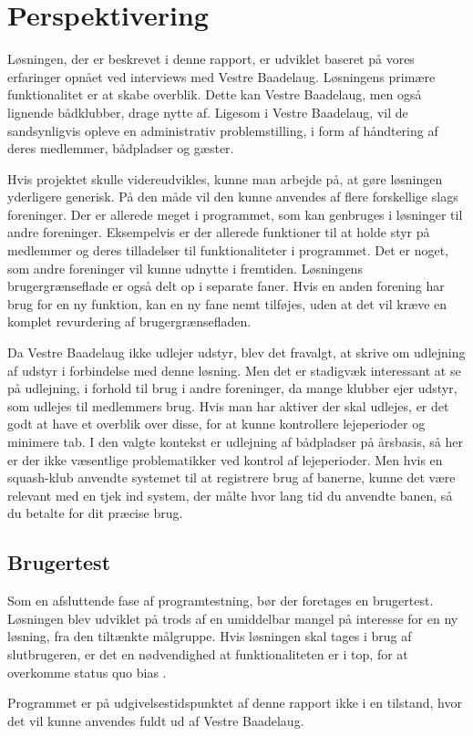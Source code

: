 \chapter{Perspektivering}
\label{cha:perspektivering}

Løsningen, der er beskrevet i denne rapport, er udviklet baseret på vores erfaringer opnået ved interviews med Vestre Baadelaug. Løsningens primære funktionalitet er at skabe overblik. Dette kan Vestre Baadelaug, men også lignende bådklubber, drage nytte af. Ligesom i Vestre Baadelaug, vil de sandsynligvis opleve en administrativ problemstilling, i form af håndtering af deres medlemmer, bådpladser og gæster.

Hvis projektet skulle videreudvikles, kunne man arbejde på, at gøre løsningen yderligere generisk. På den måde vil den kunne anvendes af flere forskellige slags foreninger. Der er allerede meget i programmet, som kan genbruges i løsninger til andre foreninger. Eksempelvis er der allerede funktioner til at holde styr på medlemmer og deres tilladelser til funktionaliteter i programmet. Det er noget, som andre foreninger vil kunne udnytte i fremtiden. Løsningens brugergrænseflade er også delt op i separate faner. Hvis en anden forening har brug for en ny funktion, kan en ny fane nemt tilføjes, uden at det vil kræve en komplet revurdering af brugergrænsefladen.

Da Vestre Baadelaug ikke udlejer udstyr, blev det fravalgt, at skrive om udlejning af udstyr i forbindelse med denne løsning. Men det er stadigvæk interessant at se på udlejning, i forhold til brug i andre foreninger, da mange klubber ejer udstyr, som udlejes til medlemmers brug. Hvis man har aktiver der skal udlejes, er det godt at have et overblik over disse, for at kunne kontrollere lejeperioder og minimere tab. I den valgte kontekst er udlejning af bådpladser på årsbasis, så her er der ikke væsentlige problematikker ved kontrol af lejeperioder. Men hvis en squash-klub anvendte systemet til at registrere brug af banerne, kunne det være relevant med en tjek ind system, der målte hvor lang tid du anvendte banen, så du betalte for dit præcise brug.

\section{Brugertest}

Som en afsluttende fase af programtestning, bør der foretages en brugertest. Løsningen blev udviklet på trods af en umiddelbar mangel på interesse for en ny løsning, fra den tiltænkte målgruppe. Hvis løsningen skal tages i brug af slutbrugeren, er det en nødvendighed at funktionaliteten er i top, for at overkomme status quo bias \cite{statusquo}.

Programmet er på udgivelsestidspunktet af denne rapport ikke i en tilstand, hvor det vil kunne anvendes fuldt ud af Vestre Baadelaug.